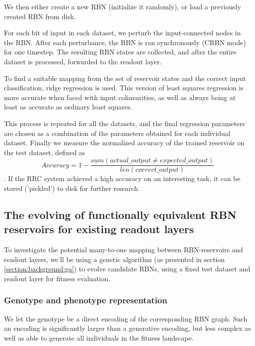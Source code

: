 We then either create a new RBN (initialize it randomly),
or load a previously created RBN from disk.

For each bit of input in each dataset,
we perturb the input-connected nodes in the RBN.
After each perturbance, the RBN is ran synchronously (CRBN mode) for one timestep.
The resulting RBN states are collected,
and after the entire dataset is processed,
forwarded to the readout layer.

To find a suitable mapping from the set of reservoir states and the correct input classification,
ridge regression \cite{hoerl1970ridge} is used.
This version of least squares regression is more accurate when faced with input colinearities,
as well as always being at least as accurate as ordinary least squares.

This process is repeated for all the datasets,
and the final regression parameters are chosen as a combination of the parameters obtained for each individual dataset.
Finally we measure the normalized accuracy of the trained reservoir on the test dataset,
defined as
\begin{equation}
Accuracy = 1 - \dfrac{sum(actual\_output \neq expected\_output)}{len(correct\_output)}
\label{formula:accuracy}
\end{equation}
.
If the RRC system achieved a high accuracy on an interesting task,
it can be stored ('pickled') to disk for further research.

\subsection{The evolving of functionally equivalent RBN reservoirs for existing readout layers}
\label{section:method:evolving-rbns}

To investigate the potential many-to-one mapping between RBN-reservoirs and readout layers,
we'll be using a genetic algorithm (as presented in section \ref{section:background:ga}) to evolve candidate RBNs,
using a fixed test dataset and readout layer for fitness evaluation.

\subsubsection{Genotype and phenotype representation}

We let the genotype be a direct encoding of the corresponding RBN graph.
Such an encoding is significantly larger than a generative encoding,
but less complex as well as able to generate all individuals in the fitness landscape.

